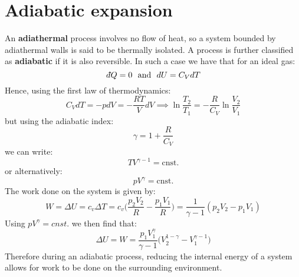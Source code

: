 \documentclass[a4paper,11pt,oneside]{book}
\newcommand{\dbar}{d\hspace*{-0.08em}\bar{}\hspace*{0.1em}}
\begin{document}
\section{Adiabatic expansion}
An \textbf{adiathermal} process involves no flow of heat, so a system bounded by adiathermal walls is said to be thermally isolated. A process is further classified as \textbf{adiabatic} if it is also reversible. In such a case we have that for an ideal gas:
\begin{equation}
    \dbar Q = 0 \ \text{ and } \ dU = C_V dT
\end{equation}
Hence, using the first law of thermodynamics:
\begin{equation}
    C_V dT = -p dV = - \frac{RT}{V}dV \implies \ln \frac{T_2}{T_1} = -\frac{R}{C_V} \ln \frac{V_2}{V_1}
\end{equation}
but using the adiabatic index:
\begin{equation}
    \gamma = 1+\frac{R}{C_V} 
\end{equation}
we can write:
\begin{equation}
    TV^{\gamma-1} = \text{cnst.}
\end{equation}
or alternatively:
\begin{equation}
    pV^{\gamma}=\text{cnst.}
\end{equation}
The work done on the system is given by:
\begin{equation}
    W = \Delta U = c_v \Delta T = c_v \bigg(\frac{p_2V_2}{R}-\frac{p_1V_1}{R}\bigg)=\frac{1}{\gamma -1}(p_2V_2 - p_1V_1)
\end{equation} 
Using $pV^\gamma = cnst.$ we then find that:
\begin{equation}
    \Delta U = W = \frac{p_1 V_1^\gamma}{\gamma-1}\bigg(V_2^{1-\gamma}-V_1^{\gamma-1}\bigg)
\end{equation}
Therefore during an adiabatic process, reducing the internal energy of a system allows for work to be done on the surrounding environment. 
\end{document}
